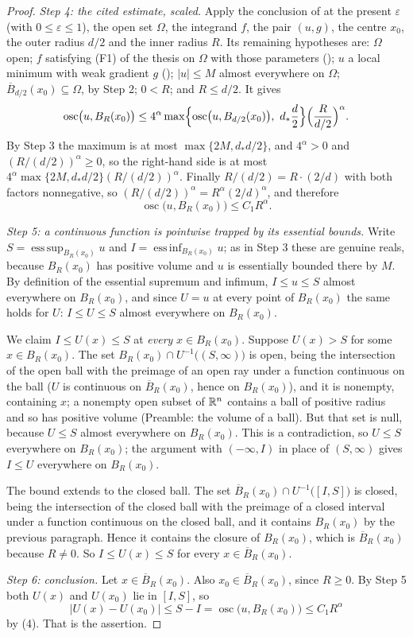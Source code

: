 \begin{proof}
\emph{Step 4: the cited estimate, scaled.}  Apply the conclusion of
 at the present $\varepsilon$ (with
$0\le\varepsilon\le1$), the open set $\Omega$, the integrand $f$, the pair
$(u,g)$, the centre $x_0$, the outer radius $d/2$ and the inner radius $R$.  Its
remaining hypotheses are: $\Omega$ open; $f$ satisfying (F1) of the thesis on
$\Omega$ with those parameters (); $u$ a local
minimum with weak gradient $g$ (); $|u|\le M$ almost
everywhere on $\Omega$; $\overline B_{d/2}(x_0)\subseteq\Omega$, by Step 2;
$0<R$; and $R\le d/2$.  It gives
\[
\operatorname*{osc}\bigl(u,B_R(x_0)\bigr)
\le4^{\alpha}\max\Bigl\{\operatorname*{osc}\bigl(u,B_{d/2}(x_0)\bigr),\
d_\ast\frac d2\Bigr\}\Bigl(\frac{R}{d/2}\Bigr)^{\alpha}.
\]
By Step 3 the maximum is at most $\max\{2M,d_\ast d/2\}$, and
$4^{\alpha}>0$ and $(R/(d/2))^{\alpha}\ge0$, so the right-hand side is at most
$4^{\alpha}\max\{2M,d_\ast d/2\}(R/(d/2))^{\alpha}$.  Finally
$R/(d/2)=R\cdot(2/d)$ with both factors nonnegative, so
$(R/(d/2))^{\alpha}=R^{\alpha}(2/d)^{\alpha}$, and therefore
\[
\operatorname*{osc}\bigl(u,B_R(x_0)\bigr)\le C_1R^{\alpha}.
\tag{4}
\]

\emph{Step 5: a continuous function is pointwise trapped by its essential
bounds.}  Write $S=\operatorname{ess\,sup}_{B_R(x_0)}u$ and
$I=\operatorname{ess\,inf}_{B_R(x_0)}u$; as in Step 3 these are genuine reals,
because $B_R(x_0)$ has positive volume and $u$ is essentially bounded there by
$M$.  By definition of the essential supremum and infimum, $I\le u\le S$ almost
everywhere on $B_R(x_0)$, and since $U=u$ at every point of $B_R(x_0)$ the same
holds for $U$: $I\le U\le S$ almost everywhere on $B_R(x_0)$.

We claim $I\le U(x)\le S$ at \emph{every} $x\in B_R(x_0)$.  Suppose
$U(x)>S$ for some $x\in B_R(x_0)$.  The set
$B_R(x_0)\cap U^{-1}\bigl((S,\infty)\bigr)$ is open, being the intersection of
the open ball with the preimage of an open ray under a function continuous on
the ball ($U$ is continuous on $\overline B_R(x_0)$, hence on $B_R(x_0)$), and
it is nonempty, containing $x$; a nonempty open subset of $\mathbb{R}^n$ contains a
ball of positive radius and so has positive volume (Preamble: the volume of a
ball).  But that set is null, because $U\le S$ almost everywhere on
$B_R(x_0)$.  This is a contradiction, so $U\le S$ everywhere on $B_R(x_0)$; the
argument with $(-\infty,I)$ in place of $(S,\infty)$ gives $I\le U$ everywhere
on $B_R(x_0)$.

The bound extends to the closed ball.  The set
$\overline B_R(x_0)\cap U^{-1}\bigl([I,S]\bigr)$ is closed, being the
intersection of the closed ball with the preimage of a closed interval under a
function continuous on the closed ball, and it contains $B_R(x_0)$ by the
previous paragraph.  Hence it contains the closure of $B_R(x_0)$, which is
$\overline B_R(x_0)$ because $R\ne0$.  So $I\le U(x)\le S$ for every
$x\in\overline B_R(x_0)$.

\emph{Step 6: conclusion.}  Let $x\in\overline B_R(x_0)$.  Also
$x_0\in\overline B_R(x_0)$, since $R\ge0$.  By Step 5 both $U(x)$ and $U(x_0)$
lie in $[I,S]$, so
\[
|U(x)-U(x_0)|\le S-I=\operatorname*{osc}\bigl(u,B_R(x_0)\bigr)\le C_1R^{\alpha}
\]
by (4).  That is the assertion.
\end{proof}
